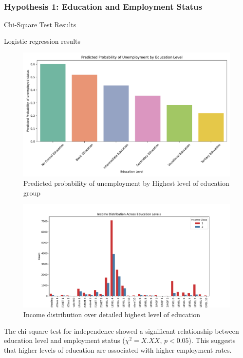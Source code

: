 \subsubsection{Hypothesis 1: Education and Employment Status}

\begin{table}[H]
    \caption{Chi-Square Test Results}
    \label{tab:chi_square_results}
    \begin{minipage}{\columnwidth}
        \centering
        
    \end{minipage}
\end{table}

\begin{table}[H]
    \centering
    \scriptsize
    \caption{Logistic regression results}
    \begin{minipage}{\columnwidth}
        
    \end{minipage}
\end{table}

\begin{figure}[H]
    \centering
    \includegraphics[width=\columnwidth]{images/hyp_1_log_pred.pdf} %
    \caption{Predicted probability of unemployment by Highest level of education group}
    \label{fig:predicted unemployment for highest academic level}
\end{figure}

\begin{figure}[H]
    \centering
    \includegraphics[width=\columnwidth]{images/hyp_1_income_dist.pdf} %
    \caption{Income distribution over detailed highest level of education}
    \label{fig:unemployment distribution for unemployment highest academic level}
\end{figure}

The chi-square test for independence showed a significant relationship between education level and employment status ($\chi^2 = X.XX$, $p < 0.05$). This suggests that higher levels of education are associated with higher employment rates.
